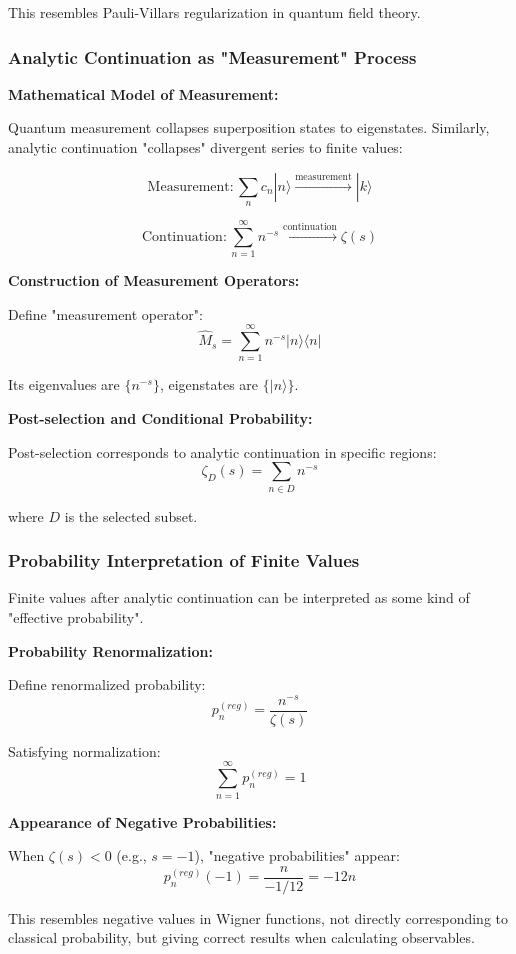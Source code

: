 \documentclass[11pt]{article}
\theoremstyle{plain}
\theoremstyle{definition}
\theoremstyle{remark}
\begin{document}
This resembles Pauli-Villars regularization in quantum field theory.

\subsubsection{Analytic Continuation as "Measurement" Process}

\textbf{Mathematical Model of Measurement:}

Quantum measurement collapses superposition states to eigenstates. Similarly, analytic continuation "collapses" divergent series to finite values:

$$\text{Measurement}: \sum_{n} c_n |n\rangle \xrightarrow{\text{measurement}} |k\rangle$$

$$\text{Continuation}: \sum_{n=1}^{\infty} n^{-s} \xrightarrow{\text{continuation}} \zeta(s)$$

\textbf{Construction of Measurement Operators:}

Define "measurement operator":
$$\hat{M}_s = \sum_{n=1}^{\infty} n^{-s} |n\rangle\langle n|$$

Its eigenvalues are $\{n^{-s}\}$, eigenstates are $\{|n\rangle\}$.

\textbf{Post-selection and Conditional Probability:}

Post-selection corresponds to analytic continuation in specific regions:
$$\zeta_D(s) = \sum_{n \in D} n^{-s}$$

where $D$ is the selected subset.

\subsubsection{Probability Interpretation of Finite Values}

Finite values after analytic continuation can be interpreted as some kind of "effective probability".

\textbf{Probability Renormalization:}

Define renormalized probability:
$$p_n^{(reg)} = \frac{n^{-s}}{\zeta(s)}$$

Satisfying normalization:
$$\sum_{n=1}^{\infty} p_n^{(reg)} = 1$$

\textbf{Appearance of Negative Probabilities:}

When $\zeta(s) < 0$ (e.g., $s = -1$), "negative probabilities" appear:
$$p_n^{(reg)}(-1) = \frac{n}{-1/12} = -12n$$

This resembles negative values in Wigner functions, not directly corresponding to classical probability, but giving correct results when calculating observables.
\end{document}
